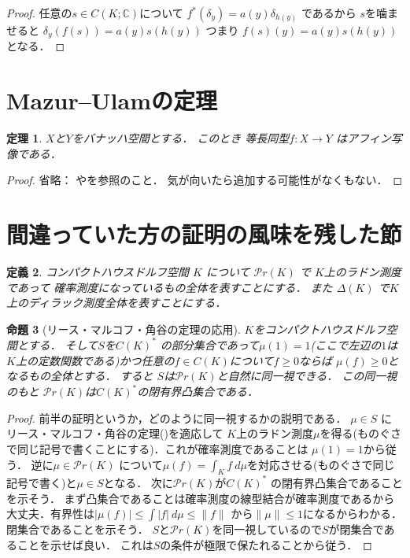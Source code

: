 \documentclass[leqno, a4paper, 12pt]{jsarticle}
\newtheorem{thm}{定理}
\newtheorem{prop}[thm]{命題}
\newtheorem{df}[thm]{定義}
\newcommand{\cc}{\mathbb{C}}
\newcommand{\myprob}[1]{\mathcal{P}r(#1)}
\newcommand{\mydiracset}[1]{\Delta(#1)}
\newcommand{\mydirac}[1]{\delta_{#1}}
\begin{document}
\begin{proof}
任意の$s\in C(K; \cc)$について
$f^{*}(\mydirac{y})=a(y)\mydirac{h(y)}$
であるから
$s$を噛ませると
$\mydirac{y}(f(s))=a(y)s(h(y))$
つまり
$f(s)(y)=a(y)s(h(y))$
となる．

\end{proof}


\section{Mazur--Ulamの定理}

\begin{thm}\label{thm:mumu}
$X$と$Y$をバナッハ空間とする．
このとき
等長同型$f\colon X\to Y$
はアフィン写像である．
\end{thm}
\begin{proof}
省略：\cite{nica} や\cite{vai}を参照のこと．
気が向いたら追加する可能性がなくもない．
\end{proof}



\section{間違っていた方の証明の風味を残した節}

\begin{df}
コンパクトハウスドルフ空間
$K$
について
$\myprob{K}$
で
$K$上のラドン測度であって
確率測度になっているもの全体を表すことにする．
また
$\mydiracset{K}$
で$K$上のディラック測度全体を表すことにする．
\end{df}


\begin{prop}[リース・マルコフ・角谷の定理の応用]
$K$をコンパクトハウスドルフ空間とする．
そして$S$を$C(K)^{*}$
の部分集合であって$\mu(1)=1$(ここで左辺の$1$は$K$上の定数関数である)かつ任意の$f\in C(K)$について$f\ge 0$ならば
$\mu(f)\ge 0$となるもの全体とする．
すると
$S$は$\myprob{K}$と自然に同一視できる．
この同一視のもと
$\myprob{K}$は$C(K)^{*}$の閉有界凸集合である．
\end{prop}
\begin{proof}
前半の証明というか，どのように同一視するかの説明である．
$\mu\in S$
にリース・マルコフ・角谷の定理(\cite{dempa1})を適応して
$K$上のラドン測度$\mu$を得る(ものぐさで同じ記号で書くことにする)．これが確率測度であることは
$\mu(1)=1$から従う．
逆に$\mu\in \myprob{K}$
について$\mu(f)=\int_{K}f\ d\mu$を対応させる(ものぐさで同じ記号で書く)と$\mu\in S$となる．
次に$\myprob{K}$が$C(K)^{*}$
の閉有界凸集合であることを示そう．
まず凸集合であることは確率測度の線型結合が確率測度であるから大丈夫．有界性は$|\mu(f)|\le \int |f|\ d\mu\le \|f\|$
から$\|\mu\|\le 1$になるからわかる．
閉集合であることを示そう．
$S$と$\myprob{K}$を同一視しているので$S$が閉集合であることを示せば良い．
これは$S$の条件が極限で保たれることから従う．
\end{proof}
\end{document}
